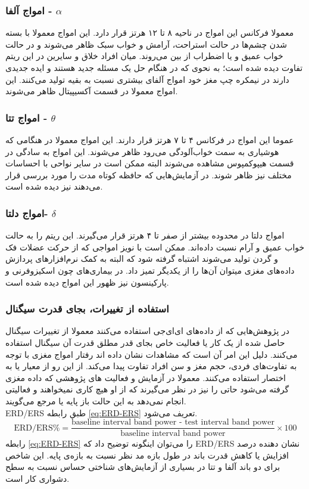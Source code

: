 \subsubsection*{امواج آلفا - $ \alpha $}
معمولا فرکانس این امواج در ناحیه ۸ تا ۱۲ هرتز قرار دارد. این امواج معمولا با بسته شدن چشم‌ها در حالت استراحت، آرامش و خواب سبک ظاهر می‌شوند و در حالت خواب عمیق و یا اضطراب از بین می‌روند. میان افراد خلاق و سایرین در این ریتم تفاوت دیده شده است؛ به نحوی که در هنگام حل یک مسئله جدید هستند و ایده جدیدی دارند در نیمکره چپ مغز خود امواج آلفای بیشتری نسبت به بقیه تولید می‌کنند. این امواج معمولا در قسمت آکسیپیتال ظاهر می‌شوند.
\subsubsection*{امواج تتا - $ \theta $}
عموما این امواج در فرکانس ۴ تا ۷ هرتز قرار دارند. این امواج معمولا در هنگامی که هوشیاری به سمت خواب‌آلودگی می‌رود ظاهر می‌شوند. این امواج به سادگی در قسمت هیپوکمپوس
مشاهده می‌شوند البته ممکن است در سایر نواحی با احساسات مختلف نیز ظاهر شوند. در آزمایش‌هایی که حافظه کوتاه مدت را مورد بررسی قرار می‌دهند نیز دیده شده است.
\cite{vertes2005hippocampal}

\subsubsection*{امواج دلتا- $ \delta $}
 امواج دلتا در محدوده بیشتر از صفر  تا ۴ هرتز قرار می‌گیرند. این ریتم را به حالت خواب عمیق و آرام نسبت داده‌اند. ممکن است با نویز امواجی که از حرکت عضلات فک و گردن تولید می‌شوند اشتباه گرفته شود که البته به کمک نرم‌افزار‌های پردازش داده‌های مغزی میتوان آن‌ها را از یکدیگر تمیز داد. در بیماری‌های چون اسکیزوفرنی و پارکینسون نیز ظهور این امواج دیده شده است.
\subsubsection{استفاده از تغییرات، بجای قدرت سیگنال}
در پژوهش‌هایی که از داده‌های ‌ای‌ای‌جی استفاده می‌کنند معمولا از تغییرات سیگنال حاصل شده از یک کار یا فعالیت خاص بجای قدر مطلق قدرت
آن سیگنال استفاده می‌کنند. دلیل این امر آن است که مشاهدات نشان داده اند رفتار امواج مغزی با توجه به تفاوت‌های فردی، حجم مغز و سن افراد تفاوت پیدا می‌کند. از این رو از معیار
یا به اختصار
استفاده می‌کنند.
معمولا در آزمایش و فعالیت های پژوهشی که داده مغزی گرفته می‌شود حاتی را نیز در نظر می‌گیرند که از او هیچ کاری نمیخواهند و فعالیتی انجام نمی‌دهد به این حالت باز پایه یا مرجع
 می‌گویند.
 \\
 ERD/ERS
 طبق رابطه 
 \ref{eq:ERD-ERS}
 تعریف می‌شود.
 \begin{equation}\label{eq:ERD-ERS}
 \text{ERD/ERS}\% = \dfrac{\text{baseline interval band power - test interval band power}}{\text{baseline interval band power}}\times 100
 \end{equation}
 رابطه 
 \ref{eq:ERD-ERS}
را می‌توان اینگونه توضیح داد که 
ERD/ERS
نشان دهنده درصد افزایش یا کاهش قدرت باند در طول بازه مد نظر نسبت به بازه‌ی پایه.
این شاخص برای دو باند آلفا و تتا در بسیاری از آزمایش‌های شناختی حساس نسبت به سطح دشواری کار است.
